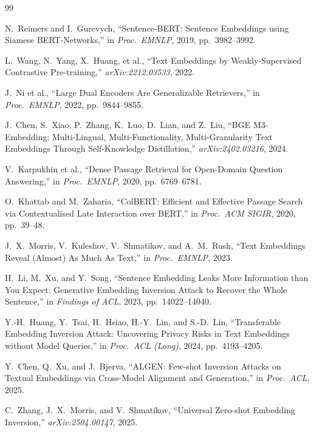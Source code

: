 \documentclass[11pt,a4paper]{article}
\begin{document}
\begin{thebibliography}{99}\small

 N.\ Reimers and I.\ Gurevych, ``Sentence-BERT:
Sentence Embeddings using Siamese BERT-Networks,'' in
\emph{Proc.\ EMNLP}, 2019, pp.\ 3982--3992.

 L.\ Wang, N.\ Yang, X.\ Huang, et al.,
``Text Embeddings by Weakly-Supervised Contrastive Pre-training,''
\emph{arXiv:2212.03533}, 2022.

 J.\ Ni et al., ``Large Dual Encoders Are Generalizable
Retrievers,'' in \emph{Proc.\ EMNLP}, 2022, pp.\ 9844--9855.

 J.\ Chen, S.\ Xiao, P.\ Zhang, K.\ Luo, D.\ Lian,
and Z.\ Liu, ``BGE M3-Embedding: Multi-Lingual, Multi-Functionality,
Multi-Granularity Text Embeddings Through Self-Knowledge Distillation,''
\emph{arXiv:2402.03216}, 2024.

 V.\ Karpukhin et al., ``Dense Passage Retrieval for
Open-Domain Question Answering,'' in \emph{Proc.\ EMNLP}, 2020,
pp.\ 6769--6781.

 O.\ Khattab and M.\ Zaharia, ``ColBERT: Efficient
and Effective Passage Search via Contextualised Late Interaction over
BERT,'' in \emph{Proc.\ ACM SIGIR}, 2020, pp.\ 39--48.

 J.\ X.\ Morris, V.\ Kuleshov, V.\ Shmatikov, and
A.\ M.\ Rush, ``Text Embeddings Reveal (Almost) As Much As Text,'' in
\emph{Proc.\ EMNLP}, 2023.

 H.\ Li, M.\ Xu, and Y.\ Song, ``Sentence Embedding
Leaks More Information than You Expect: Generative Embedding Inversion
Attack to Recover the Whole Sentence,'' in \emph{Findings of ACL}, 2023,
pp.\ 14022--14040.

 Y.-H.\ Huang, Y.\ Tsai, H.\ Hsiao, H.-Y.\ Lin, and
S.-D.\ Lin, ``Transferable Embedding Inversion Attack: Uncovering Privacy
Risks in Text Embeddings without Model Queries,'' in \emph{Proc.\ ACL
(Long)}, 2024, pp.\ 4193--4205.

 Y.\ Chen, Q.\ Xu, and J.\ Bjerva, ``ALGEN:
Few-shot Inversion Attacks on Textual Embeddings via Cross-Model
Alignment and Generation,'' in \emph{Proc.\ ACL}, 2025.

 C.\ Zhang, J.\ X.\ Morris, and V.\ Shmatikov,
``Universal Zero-shot Embedding Inversion,'' \emph{arXiv:2504.00147},
2025.


\end{thebibliography}
\end{document}
